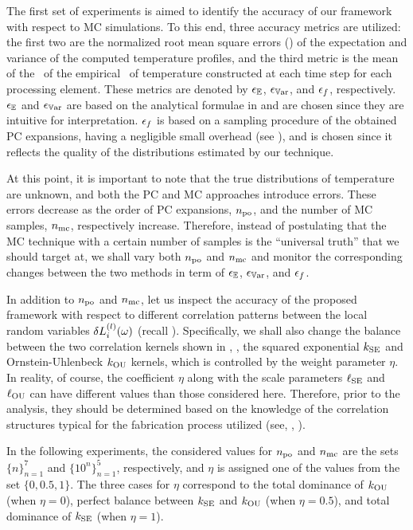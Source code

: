 The first set of experiments is aimed to identify the accuracy of our framework with respect to MC simulations.
To this end, three accuracy metrics are utilized: the first two are the normalized root mean square errors (\nrmses) of the expectation and variance of the computed temperature profiles, and the third metric is the mean of the \nrmses\ of the empirical \pdfs\ of temperature constructed at each time step for each processing element.
These metrics are denoted by $\epsilon_\mathbb{E}$, $\epsilon_{\mathbb{V}\text{ar}}$, and $\epsilon_f$, respectively.
$\epsilon_\mathbb{E}$ and $\epsilon_{\mathbb{V}\text{ar}}$ are based on the analytical formulae in  and are chosen since they are intuitive for interpretation.
$\epsilon_f$ is based on a sampling procedure of the obtained PC expansions, having a negligible small overhead (see ), and is chosen since it reflects the quality of the distributions estimated by our technique.

At this point, it is important to note that the true distributions of temperature are unknown, and both the PC and MC approaches introduce errors. These errors decrease as the order of PC expansions, ${n_\text{po}}$, and the number of MC samples, ${n_\text{mc}}$, respectively increase.
Therefore, instead of postulating that the MC technique with a certain number of samples is the ``universal truth'' that we should target at, we shall vary both ${n_\text{po}}$ and ${n_\text{mc}}$ and monitor the corresponding changes between the two methods in term of $\epsilon_\mathbb{E}$, $\epsilon_{\mathbb{V}\text{ar}}$, and $\epsilon_f$.

In addition to ${n_\text{po}}$ and ${n_\text{mc}}$, let us inspect the accuracy of the proposed framework with respect to different correlation patterns between the local random variables $\delta L^{(l)}_i(\omega)$ (recall ).
Specifically, we shall also change the balance between the two correlation kernels shown in , \ie, the squared exponential $\fCorr_\SE$ and Ornstein-Uhlenbeck $\fCorr_\OU$ kernels, which is controlled by the weight parameter $\eta$.
In reality, of course, the coefficient $\eta$ along with the scale parameters $\ell_{\text{SE}}$ and $\ell_{\text{OU}}$ can have different values than those considered here.
Therefore, prior to the analysis, they should be determined based on the knowledge of the correlation structures typical for the fabrication process utilized (see, \eg, \cite{ghanta2006, friedberg2005}).

In the following experiments, the considered values for ${n_\text{po}}$ and ${n_\text{mc}}$ are the sets $\{ n \}_{n = 1}^7$ and $\{ 10^n \}_{n = 1}^5$, respectively, and $\eta$ is assigned one of the values from the set $\{ 0, 0.5, 1 \}$.
The three cases for $\eta$ correspond to the total dominance of $\fCorr_\OU$ (when $\eta = 0$), perfect balance between $\fCorr_\SE$ and $\fCorr_\OU$ (when $\eta = 0.5$), and total dominance of $\fCorr_\SE$ (when $\eta = 1$).

